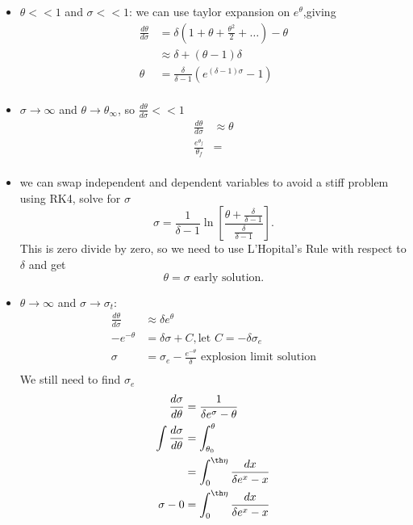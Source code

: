 \documentclass[class=article, crop=false]{standalone}
\theoremstyle{plain}
\theoremstyle{remark}
\begin{document}
\begin{itemize}
	\item $\theta << 1$ and $\sigma<<1$: we can use taylor expansion on $e^{\theta}$,giving
		\begin{align*}
			\frac{d \theta}{d\sigma}&=\delta(1+\theta+\frac{\theta^2}{2}+\ldots)-\theta\\
						& \approx \delta + (\theta-1) \delta\\
			\theta & = \frac{\delta}{\delta-1} (e^{(\delta-1)\sigma}-1)\\ 
		 \end{align*}
	 \item $\sigma \to \infty$ and $\theta \to \theta_\infty$, so $\frac{d\theta}{d\sigma}<<1$
		 \begin{align*}
		 	\frac{d\theta}{d\sigma}&\approx \theta \\
			\frac{e^{\theta_f}}{\theta_f}&=   \\
		 \end{align*}
	\item we can swap independent and dependent variables to avoid a stiff problem using RK4, solve for $\sigma$
		\[
			\sigma=\frac{1}{\delta-1}\ln \left[ \frac{\theta+\frac{\delta}{\delta-1}}{\frac{\delta}{\delta-1}} \right] 
		.\]
		This is zero divide by zero, so we need to use L'Hopital's Rule with respect to $\delta$ and get
		\[
			\theta=\sigma \text{ early solution}
		.\]
	\item $\theta \to \infty$ and $\sigma \to \sigma_t$:
	\begin{align*}
		\frac{d \theta}{d\sigma}&\approx \delta e^{\theta} \\
		-e^{-\theta} &= \delta \sigma + C, \text{let } C=- \delta \sigma_e \\
		\sigma&= \sigma_e - \frac{e^{-\theta}}{\delta} \text{ explosion limit solution}\\
	\end{align*}
	We still need to find $\sigma_e$
	\begin{align*}
		\frac{d\sigma}{d\theta}&= \frac{1}{\delta e^{\sigma}-\theta} \\
		\int \frac{d\sigma}{d\theta}&= \int_{ \theta_0}^{ \theta}   \\
		&= \int_{ 0}^{ \th\eta} \frac{dx}{\delta e^{x}-x}   \\
		\sigma - 0&=   \int_{ 0}^{ \th\eta} \frac{dx}{\delta e^{x}-x} \\
	\end{align*}
\end{itemize}
\end{document}
